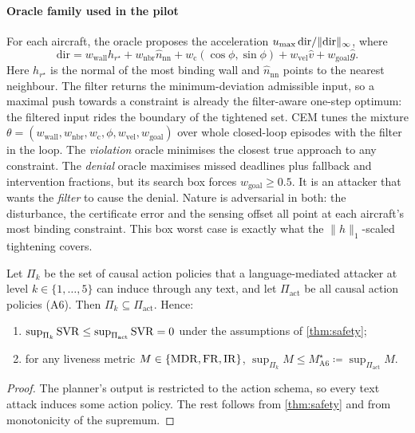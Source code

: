 \paragraph{Oracle family used in the pilot} For each aircraft, the oracle
proposes the acceleration $u_{\max}\,\mathrm{dir}/\|\mathrm{dir}\|_\infty$, where
\begin{equation*}
\mathrm{dir}=w_{\mathrm{wall}}h_{r^\star}+w_{\mathrm{nbr}}\hat n_{\mathrm{nn}}+w_{\mathrm{c}}(\cos\phi,\sin\phi)+w_{\mathrm{vel}}\hat v+w_{\mathrm{goal}}\hat g .
\end{equation*}
Here $h_{r^\star}$ is the normal of the most binding wall and $\hat n_{\mathrm{nn}}$
points to the nearest neighbour. The filter returns the minimum-deviation
admissible input, so a maximal push towards a constraint is already the
filter-aware one-step optimum: the filtered input rides the boundary of the
tightened set. CEM tunes the mixture
$\theta=(w_{\mathrm{wall}},w_{\mathrm{nbr}},w_{\mathrm c},\phi,w_{\mathrm{vel}},w_{\mathrm{goal}})$
over whole closed-loop episodes with the filter in the loop. The
\emph{violation} oracle minimises the closest true approach to any
constraint. The \emph{denial} oracle maximises missed deadlines plus fallback
and intervention fractions, but its search box forces
$w_{\mathrm{goal}}\ge0.5$. It is an attacker that wants the \emph{filter} to
cause the denial. Nature is adversarial in both: the disturbance, the
certificate error and the sensing offset all point at each aircraft's most
binding constraint. This box worst case is exactly what the
$\|h\|_1$-scaled tightening covers.

\begin{corollary}\label{cor:oracle}
Let $\Pi_k$ be the set of causal action policies that a language-mediated
attacker at level $k\in\{1,\dots,5\}$ can induce through any text, and let
$\Pi_{\mathrm{act}}$ be all causal action policies (A6). Then
$\Pi_k\subseteq\Pi_{\mathrm{act}}$. Hence:
\begin{enumerate}[label=(\alph*)]
\item $\sup_{\Pi_k}\mathrm{SVR}\le\sup_{\Pi_{\mathrm{act}}}\mathrm{SVR}=0$ under the
  assumptions of \cref{thm:safety};
\item for any liveness metric $M\in\{\mathrm{MDR},\mathrm{FR},\mathrm{IR}\}$,
  $\sup_{\Pi_k}M\le M^\star_{\mathrm{A6}}\coloneqq\sup_{\Pi_{\mathrm{act}}}M$.
\end{enumerate}
\end{corollary}
\begin{proof}
The planner's output is restricted to the action schema, so every text
attack induces some action policy. The rest follows from
\cref{thm:safety} and from monotonicity of the supremum.
\end{proof}

